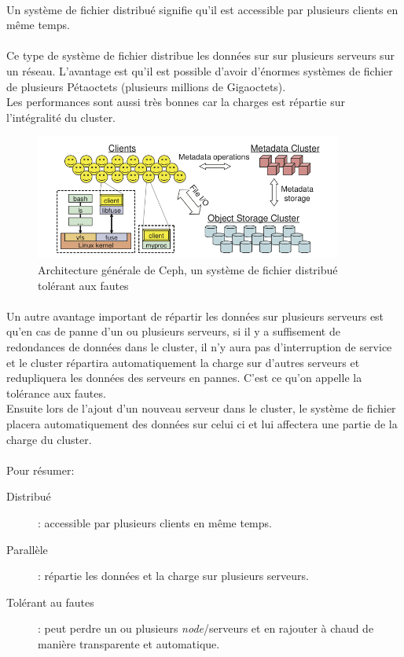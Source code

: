 \paragraph*{}
Un système de fichier distribué signifie qu'il est accessible par plusieurs clients en même temps.

\paragraph*{}
Ce type de système de fichier distribue les données sur sur plusieurs serveurs sur un réseau. L'avantage est qu'il est possible d'avoir d'énormes systèmes de fichier de plusieurs
Pétaoctets (plusieurs millions de Gigaoctets).\\
Les performances sont aussi très bonnes car la charges est répartie sur l'intégralité du cluster.

\begin{figure}[H]
\centering
\includegraphics[width=0.9\textwidth]{resource/img/ceph-architecture}
\caption{Architecture générale de Ceph, un système de fichier distribué tolérant aux fautes}
\label{archionescalein}
\end{figure}

\paragraph*{}
Un autre avantage important de répartir les données sur plusieurs serveurs est qu'en cas de panne d'un ou plusieurs serveurs, si il y a suffisement de redondances
de données dans le cluster, il n'y aura pas d'interruption de service et le cluster répartira automatiquement la charge sur d'autres serveurs et redupliquera les données
des serveurs en pannes. C'est ce qu'on appelle la tolérance aux fautes.\\
Ensuite lors de l'ajout d'un nouveau serveur dans le cluster, le système de fichier placera automatiquement des données sur celui ci et lui affectera une
partie de la charge du cluster.

\paragraph*{}
Pour résumer:
\begin{description}
	\item[Distribué] : accessible par plusieurs clients en même temps.
	\item[Parallèle] : répartie les données et la charge sur plusieurs serveurs.
	\item[Tolérant au fautes]: peut perdre un ou plusieurs \emph{node}/serveurs et en rajouter à chaud de manière transparente et automatique.
\end{description}

